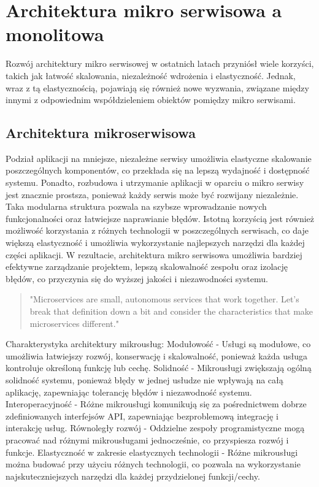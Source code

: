 \documentclass[runningheads,12pt]{llncs} \usepackage{graphicx} \usepackage{todonotes} \usepackage{fancyhdr} \usepackage{lipsum} \usepackage[T1]{fontenc} \usepackage[provide=*,english,polish]{babel}
\begin{document}
\newpage

\section{Architektura mikro serwisowa a monolitowa} 

Rozwój architektury mikro serwisowej w ostatnich latach przyniósł wiele korzyści, takich jak łatwość skalowania, niezależność wdrożenia i elastyczność. Jednak, wraz z tą elastycznością, pojawiają się również nowe wyzwania, związane między innymi z odpowiednim współdzieleniem obiektów pomiędzy mikro serwisami. 

\subsection{Architektura mikroserwisowa}

Podział aplikacji na mniejsze, niezależne serwisy umożliwia elastyczne skalowanie poszczególnych komponentów, co przekłada się na lepszą wydajność i dostępność systemu. Ponadto, rozbudowa i utrzymanie aplikacji w oparciu o mikro serwisy jest znacznie prostsza, ponieważ każdy serwis może być rozwijany niezależnie. Taka modularna struktura pozwala na szybsze wprowadzanie nowych funkcjonalności oraz łatwiejsze naprawianie błędów. Istotną korzyścią jest również możliwość korzystania z różnych technologii w poszczególnych serwisach, co daje większą elastyczność i umożliwia wykorzystanie najlepszych narzędzi dla każdej części aplikacji. W rezultacie, architektura mikro serwisowa umożliwia bardziej efektywne zarządzanie projektem, lepszą skalowalność zespołu oraz izolację błędów, co przyczynia się do wyższej jakości i niezawodności systemu.

\begin{quote}
    "Microservices are small, autonomous services that work together. Let’s break that definition down a bit and consider the characteristics that make microservices different."~\cite[p. 2]{newman2015building}
\end{quote}

Charakterystyka architektury mikrousług: 
Modułowość - Usługi są modułowe, co umożliwia łatwiejszy rozwój, konserwację i skalowalność, ponieważ każda usługa kontroluje określoną funkcję lub cechę.
Solidność - Mikrousługi zwiększają ogólną solidność systemu, ponieważ błędy w jednej usłudze nie wpływają na całą aplikację, zapewniając tolerancję błędów i niezawodność systemu.
Interoperacyjność - Różne mikrousługi komunikują się za pośrednictwem dobrze zdefiniowanych interfejsów API, zapewniając bezproblemową integrację i interakcję usług.
Równoległy rozwój - Oddzielne zespoły programistyczne mogą pracować nad różnymi mikrousługami jednocześnie, co przyspiesza rozwój i funkcje.
Elastyczność w zakresie elastycznych technologii - Różne mikrousługi można budować przy użyciu różnych technologii, co pozwala na wykorzystanie najskuteczniejszych narzędzi dla każdej przydzielonej funkcji/cechy.~\cite{sharma2023monolithic}
\end{document}
